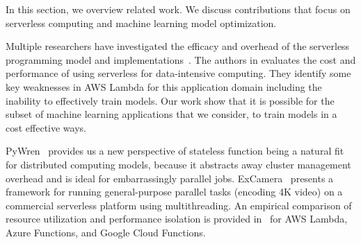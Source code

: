In this section, we overview related work. We discuss contributions that focus
on serverless computing and machine learning model optimization. 

Multiple researchers have investigated the efficacy and overhead of the
serverless programming model and 
implementations~\cite{ref:jonas2017occupy,ref:onesteptwostep, ref:baldini2017,ref:lin2018tracking}.
The authors in \cite{ref:onesteptwostep} evaluates the cost and performance of using
serverless for data-intensive computing.  They identify some key weaknesses in AWS
Lambda for this application domain including the inability to effectively train models.
Our work show that it is possible for the subset of machine learning applications that we 
consider, to train models in a cost effective ways.

PyWren~\cite{ref:jonas2017occupy} provides us a new perspective of stateless function being a natural fit for distributed computing models, because it 
abstracts away cluster management overhead and is ideal for embarrassingly parallel jobs. 
ExCamera~\cite{ref:encoding} presents a 
framework for running general-purpose parallel tasks (encoding 4K video) 
on a commercial serverless platform using multithreading. 
An empirical comparison of resource utilization and performance isolation
is provided in~\cite{ref:peeking} for AWS Lambda, 
Azure Functions, and Google Cloud Functions.


